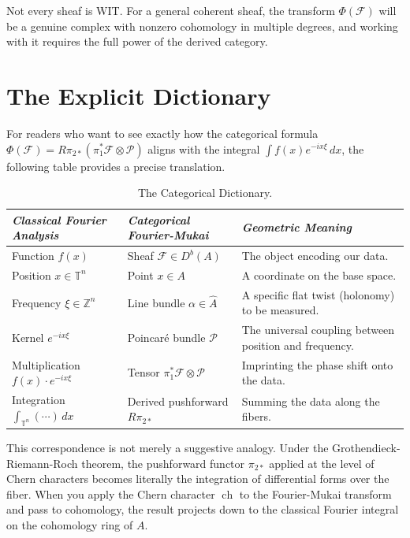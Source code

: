 \documentclass{article}
\newcommand{\T}{{\mathbb{T}}}
\newcommand{\Z}{{\mathbb{Z}}}
\newcommand{\CF}{{\mathcal{F}}}
\newcommand{\CP}{{\mathcal{P}}}
\newcommand{\ch}{{\operatorname{ch}}}
\begin{document}
Not every sheaf is WIT. For a general coherent sheaf, the transform $\Phi(\CF)$ will be a genuine complex with nonzero cohomology in multiple degrees, and working with it requires the full power of the derived category.


\section{The Explicit Dictionary}

For readers who want to see exactly how the categorical formula $\Phi(\CF) = R\pi_{2*}(\pi_1^*\CF \otimes \CP)$ aligns with the integral $\int f(x) e^{-ix\xi}\, dx$, the following table provides a precise translation.

\begin{table}[htp]
\centering
\renewcommand{\arraystretch}{1.5}
\begin{tabular}{|p{4.2cm}|p{4.5cm}|p{6cm}|}
\hline
\emph{Classical Fourier Analysis} & \emph{Categorical Fourier-Mukai} & \emph{Geometric Meaning} \\
\hline
Function $f(x)$ & Sheaf $\CF \in D^b(A)$ & The object encoding our data. \\
\hline
Position $x \in \T^n$ & Point $x \in A$ & A coordinate on the base space. \\
\hline
Frequency $\xi \in \Z^n$ & Line bundle $\alpha \in \hat{A}$ & A specific flat twist (holonomy) to be measured. \\
\hline
Kernel $e^{-ix\xi}$ & Poincar\'{e} bundle $\CP$ & The universal coupling between position and frequency. \\
\hline
Multiplication $f(x) \cdot e^{-ix\xi}$ & Tensor $\pi_1^*\CF \otimes \CP$ & Imprinting the phase shift onto the data. \\
\hline
Integration $\int_{\T^n}(\cdots)\,dx$ & Derived pushforward $R\pi_{2*}$ & Summing the data along the fibers. \\
\hline
\end{tabular}
\caption{The Categorical Dictionary.}
\label{tab:dictionary}
\end{table}

This correspondence is not merely a suggestive analogy. Under the Grothendieck-Riemann-Roch theorem, the pushforward functor $\pi_{2*}$ applied at the level of Chern characters becomes literally the integration of differential forms over the fiber. When you apply the Chern character $\ch$ to the Fourier-Mukai transform and pass to cohomology, the result projects down to the classical Fourier integral on the cohomology ring of $A$.
\end{document}
